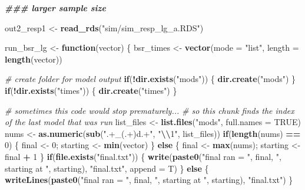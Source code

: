 \documentclass[12pt, twoside]{amherstthesis}
\newenvironment{Shaded}{\begin{snugshade}}{\end{snugshade}}
\newcommand{\AttributeTok}[1]{\textcolor[rgb]{0.13,0.29,0.53}{#1}}
\newcommand{\CommentTok}[1]{\textcolor[rgb]{0.56,0.35,0.01}{\textit{#1}}}
\newcommand{\ConstantTok}[1]{\textcolor[rgb]{0.56,0.35,0.01}{#1}}
\newcommand{\ControlFlowTok}[1]{\textcolor[rgb]{0.13,0.29,0.53}{\textbf{#1}}}
\newcommand{\DecValTok}[1]{\textcolor[rgb]{0.00,0.00,0.81}{#1}}
\newcommand{\DocumentationTok}[1]{\textcolor[rgb]{0.56,0.35,0.01}{\textbf{\textit{#1}}}}
\newcommand{\FunctionTok}[1]{\textcolor[rgb]{0.13,0.29,0.53}{\textbf{#1}}}
\newcommand{\NormalTok}[1]{#1}
\newcommand{\OtherTok}[1]{\textcolor[rgb]{0.56,0.35,0.01}{#1}}
\newcommand{\SpecialCharTok}[1]{\textcolor[rgb]{0.81,0.36,0.00}{\textbf{#1}}}
\newcommand{\StringTok}[1]{\textcolor[rgb]{0.31,0.60,0.02}{#1}}
\begin{document}
\scriptsize
\begin{Shaded}
\begin{Highlighting}[]
\DocumentationTok{\#\#\# larger sample size}

\NormalTok{out2\_resp1 }\OtherTok{\textless{}{-}} \FunctionTok{read\_rds}\NormalTok{(}\StringTok{"sim/sim\_resp\_lg\_a.RDS"}\NormalTok{)}

\NormalTok{run\_bsr\_lg }\OtherTok{\textless{}{-}} \ControlFlowTok{function}\NormalTok{(vector) \{}
\NormalTok{  bsr\_times }\OtherTok{\textless{}{-}} \FunctionTok{vector}\NormalTok{(}\AttributeTok{mode =} \StringTok{"list"}\NormalTok{, }\AttributeTok{length =} \FunctionTok{length}\NormalTok{(vector))}
  
  \CommentTok{\# create folder for model output}
  \ControlFlowTok{if}\NormalTok{(}\SpecialCharTok{!}\FunctionTok{dir.exists}\NormalTok{(}\StringTok{"mods"}\NormalTok{)) \{}
    \FunctionTok{dir.create}\NormalTok{(}\StringTok{"mods"}\NormalTok{)}
\NormalTok{  \}}
  \ControlFlowTok{if}\NormalTok{(}\SpecialCharTok{!}\FunctionTok{dir.exists}\NormalTok{(}\StringTok{"times"}\NormalTok{)) \{}
    \FunctionTok{dir.create}\NormalTok{(}\StringTok{"times"}\NormalTok{)}
\NormalTok{  \}}
  
  \CommentTok{\# sometimes this code would stop prematurely...}
  \CommentTok{\# so this chunk finds the index of the last model that was run}
\NormalTok{  list\_files }\OtherTok{\textless{}{-}} \FunctionTok{list.files}\NormalTok{(}\StringTok{"mods"}\NormalTok{, }\AttributeTok{full.names =} \ConstantTok{TRUE}\NormalTok{)}
\NormalTok{  nums }\OtherTok{\textless{}{-}} \FunctionTok{as.numeric}\NormalTok{(}\FunctionTok{sub}\NormalTok{(}\StringTok{".+\_(.+)d.+"}\NormalTok{, }\StringTok{"}\SpecialCharTok{\textbackslash{}\textbackslash{}}\StringTok{1"}\NormalTok{, list\_files))}
  \ControlFlowTok{if}\NormalTok{(}\FunctionTok{length}\NormalTok{(nums) }\SpecialCharTok{==} \DecValTok{0}\NormalTok{) \{}
\NormalTok{    final }\OtherTok{\textless{}{-}} \DecValTok{0}\NormalTok{; starting }\OtherTok{\textless{}{-}} \FunctionTok{min}\NormalTok{(vector)}
\NormalTok{  \} }\ControlFlowTok{else}\NormalTok{ \{}
\NormalTok{    final }\OtherTok{\textless{}{-}} \FunctionTok{max}\NormalTok{(nums); starting }\OtherTok{\textless{}{-}}\NormalTok{ final }\SpecialCharTok{+} \DecValTok{1}
\NormalTok{  \}}
  \ControlFlowTok{if}\NormalTok{(}\FunctionTok{file.exists}\NormalTok{(}\StringTok{"final.txt"}\NormalTok{)) \{}
    \FunctionTok{write}\NormalTok{(}\FunctionTok{paste0}\NormalTok{(}\StringTok{"final ran = "}\NormalTok{, final, }\StringTok{", starting at "}\NormalTok{, starting), }\StringTok{"final.txt"}\NormalTok{, }\AttributeTok{append =}\NormalTok{ T)}
\NormalTok{  \} }\ControlFlowTok{else}\NormalTok{ \{}
    \FunctionTok{writeLines}\NormalTok{(}\FunctionTok{paste0}\NormalTok{(}\StringTok{"final ran = "}\NormalTok{, final, }\StringTok{", starting at "}\NormalTok{, starting), }\StringTok{"final.txt"}\NormalTok{)}
\NormalTok{  \}}
  

\end{Highlighting}
\end{Shaded}
\end{document}
